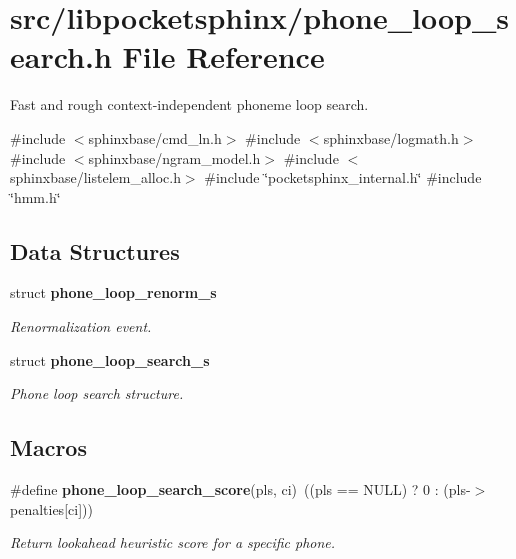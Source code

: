 \section{src/libpocketsphinx/phone\+\_\+loop\+\_\+search.h File Reference}
\label{phone__loop__search_8h}


Fast and rough context-\/independent phoneme loop search.  


{\ttfamily \#include $<$sphinxbase/cmd\+\_\+ln.\+h$>$}\newline
{\ttfamily \#include $<$sphinxbase/logmath.\+h$>$}\newline
{\ttfamily \#include $<$sphinxbase/ngram\+\_\+model.\+h$>$}\newline
{\ttfamily \#include $<$sphinxbase/listelem\+\_\+alloc.\+h$>$}\newline
{\ttfamily \#include \char`\"{}pocketsphinx\+\_\+internal.\+h\char`\"{}}\newline
{\ttfamily \#include \char`\"{}hmm.\+h\char`\"{}}\newline
\subsection*{Data Structures}
\begin{DoxyCompactItemize}
\item 
struct \textbf{ phone\+\_\+loop\+\_\+renorm\+\_\+s}
\begin{DoxyCompactList}\small\item\em Renormalization event. \end{DoxyCompactList}\item 
struct \textbf{ phone\+\_\+loop\+\_\+search\+\_\+s}
\begin{DoxyCompactList}\small\item\em Phone loop search structure. \end{DoxyCompactList}\end{DoxyCompactItemize}
\subsection*{Macros}
\begin{DoxyCompactItemize}
\item 
\mbox{\label{phone__loop__search_8h_ab49609ce2ff4d1827f57693f463e360b}} 
\#define \textbf{ phone\+\_\+loop\+\_\+search\+\_\+score}(pls,  ci)~((pls == N\+U\+LL) ? 0 \+: (pls-\/$>$penalties[ci]))
\begin{DoxyCompactList}\small\item\em Return lookahead heuristic score for a specific phone. \end{DoxyCompactList}\end{DoxyCompactItemize}
